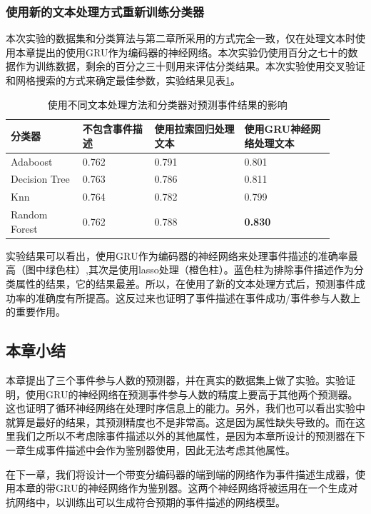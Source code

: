 \documentclass[12pt]{template}
\begin{document}
\subsubsection{使用新的文本处理方式重新训练分类器}\label{train_discrimiator}
本次实验的数据集和分类算法与第二章所采用的方式完全一致，仅在处理文本时使用本章提出的使用GRU作为编码器的神经网络。本次实验仍使用百分之七十的数据作为训练数据，剩余的百分之三十则用来评估分类结果。本次实验使用交叉验证和网格搜索的方式来确定最佳参数，实验结果见表\ref{t2-2}。

\begin{table}[htb] \label{t2-2}
    \centering
    \caption{使用不同文本处理方法和分类器对预测事件结果的影响}
    \begin{tabular*}{\linewidth}{p{0.2\linewidth}p{0.2\linewidth}p{0.25\linewidth}p{0.25\linewidth}}
\toprule 
分类器&不包含事件描述&使用拉索回归处理文本&使用GRU神经网络处理文本\\
\midrule
Adaboost & 0.762 & 0.791 & 0.801 \\
Decision Tree& 0.763 & 0.786 & 0.811\\
Knn & 0.764 & 0.782 & 0.799 \\
Random Forest & 0.762 & 0.788 & \textbf{0.830} \\
\bottomrule
    \end{tabular*}
\end{table}

实验结果可以看出，使用$\mathrm{GRU}$作为编码器的神经网络来处理事件描述的准确率最高（图中绿色柱）,其次是使用lasso处理（橙色柱）。蓝色柱为排除事件描述作为分类属性的结果，它的结果最差。所以，在使用了新的文本处理方式后，预测事件成功率的准确度有所提高。这反过来也证明了事件描述在事件成功/事件参与人数上的重要作用。
\subsection{本章小结}
本章提出了三个事件参与人数的预测器，并在真实的数据集上做了实验。实验证明，使用GRU的神经网络在预测事件参与人数的精度上要高于其他两个预测器。这也证明了循环神经网络在处理时序信息上的能力。另外，我们也可以看出实验中就算是最好的结果，其预测精度也不是非常高。这是因为属性缺失导致的。而在这里我们之所以不考虑除事件描述以外的其他属性，是因为本章所设计的预测器在下一章生成事件描述中会作为鉴别器使用，因此无法考虑其他属性。

在下一章，我们将设计一个带变分编码器的端到端的网络作为事件描述生成器，使用本章的带GRU的神经网络作为鉴别器。这两个神经网络将被运用在一个生成对抗网络中，以训练出可以生成符合预期的事件描述的网络模型。
\end{document}
